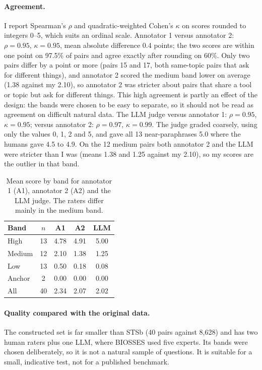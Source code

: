 \documentclass[11pt]{article}
\begin{document}
\paragraph{Agreement.}
I report Spearman's $\rho$ and quadratic-weighted Cohen's $\kappa$ on scores rounded to integers 0--5, which suits an ordinal scale. Annotator 1 versus annotator 2: $\rho=0.95$, $\kappa=0.95$, mean absolute difference 0.4 points; the two scores are within one point on 97.5\% of pairs and agree exactly after rounding on 60\%. Only two pairs differ by a point or more (pairs 15 and 17, both same-topic pairs that ask for different things), and annotator 2 scored the medium band lower on average (1.38 against my 2.10), so annotator 2 was stricter about pairs that share a tool or topic but ask for different things. This high agreement is partly an effect of the design: the bands were chosen to be easy to separate, so it should not be read as agreement on difficult natural data. The LLM judge versus annotator 1: $\rho=0.95$, $\kappa=0.95$; versus annotator 2: $\rho=0.97$, $\kappa=0.99$. The judge graded coarsely, using only the values 0, 1, 2 and 5, and gave all 13 near-paraphrases 5.0 where the humans gave 4.5 to 4.9. On the 12 medium pairs both annotator 2 and the LLM were stricter than I was (means 1.38 and 1.25 against my 2.10), so my scores are the outlier in that band.

\begin{table}[t]
\centering\small
\begin{tabular}{lcccc}
\toprule
Band & $n$ & A1 & A2 & LLM \\
\midrule
High & 13 & 4.78 & 4.91 & 5.00 \\
Medium & 12 & 2.10 & 1.38 & 1.25 \\
Low & 13 & 0.50 & 0.18 & 0.08 \\
Anchor & 2 & 0.00 & 0.00 & 0.00 \\
All & 40 & 2.34 & 2.07 & 2.02 \\
\bottomrule
\end{tabular}
\caption{Mean score by band for annotator 1 (A1), annotator 2 (A2) and the LLM judge. The raters differ mainly in the medium band.}
\label{tab:bands}
\end{table}

\paragraph{Quality compared with the original data.}
The constructed set is far smaller than STSb (40 pairs against 8,628) and has two human raters plus one LLM, where BIOSSES used five experts. Its bands were chosen deliberately, so it is not a natural sample of questions. It is suitable for a small, indicative test, not for a published benchmark.
\end{document}
